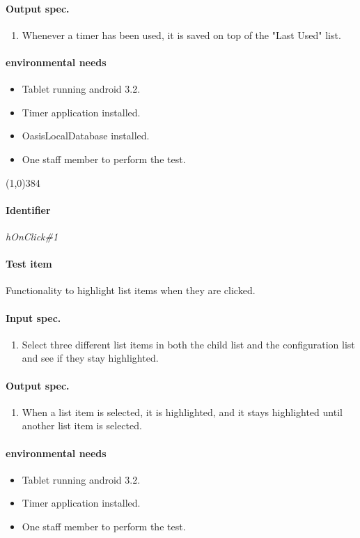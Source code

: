 \paragraph{Output spec.}
	\begin{enumerate}
		\item Whenever a timer has been used, it is saved on top of the "Last Used" list.
	\end{enumerate}
\paragraph{environmental needs}
	\begin{itemize}
		\item Tablet running android 3.2.
		\item Timer application installed.
		\item OasisLocalDatabase installed.
		\item One staff member to perform the test.
	\end{itemize}
\begin{center}
	\line(1,0){384}
\end{center}

\paragraph{Identifier}
	\textit{hOnClick\#1}
\paragraph{Test item}
	Functionality to highlight list items when they are clicked.
\paragraph{Input spec.}
	\begin{enumerate}
		\item Select three different list items in both the child list and the configuration list and see if they stay highlighted.
	\end{enumerate}
\paragraph{Output spec.}
	\begin{enumerate}
		\item When a list item is selected, it is highlighted, and it stays highlighted until another list item is selected.
	\end{enumerate}
\paragraph{environmental needs}
	\begin{itemize}
		\item Tablet running android 3.2.
		\item Timer application installed.
		\item One staff member to perform the test.
	\end{itemize}
